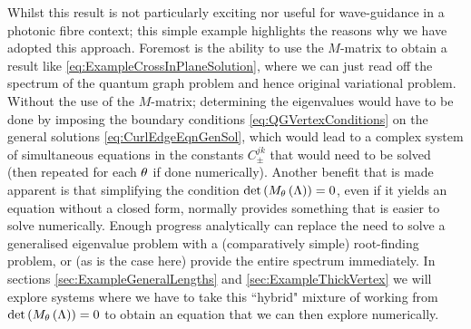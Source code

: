 Whilst this result is not particularly exciting nor useful for wave-guidance in a photonic fibre context; this simple example highlights the reasons why we have adopted this approach.
Foremost is the ability to use the $M$-matrix to obtain a result like \eqref{eq:ExampleCrossInPlaneSolution}, where we can just read off the spectrum of the quantum graph problem and hence original variational problem.
Without the use of the $M$-matrix; determining the eigenvalues would have to be done by imposing the boundary conditions \eqref{eq:QGVertexConditions} on the general solutions \eqref{eq:CurlEdgeEqnGenSol}, which would lead to a complex system of simultaneous equations in the constants $C_{\pm}^{jk}$ that would need to be solved (then repeated for each $\theta$ if done numerically).
Another benefit that is made apparent is that simplifying the condition $\det\left( M_{\theta}\left( \Lambda \right) \right) = 0$, even if it yields an equation without a closed form, normally provides something that is easier to solve numerically.
Enough progress analytically can replace the need to solve a generalised eigenvalue problem with a (comparatively simple) root-finding problem, or (as is the case here) provide the entire spectrum immediately.
In sections \ref{sec:ExampleGeneralLengths} and \ref{sec:ExampleThickVertex} we will explore systems where we have to take this ``hybrid" mixture of working from $\det\left( M_{\theta}\left( \Lambda \right) \right) = 0$ to obtain an equation that we can then explore numerically.


